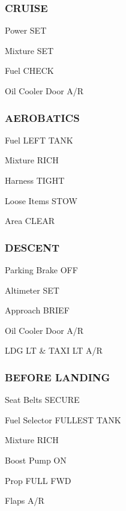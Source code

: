 \begin{multicols}{2}
\subsubsection*{CRUISE}
\begin{enumerate*}
\item Power \dotfill SET
\item Mixture \dotfill SET
\item Fuel \dotfill CHECK
\item Oil Cooler Door \dotfill A/R
\end{enumerate*}

\columnbreak
\subsubsection*{AEROBATICS}
\begin{enumerate*}
\item Fuel \dotfill LEFT TANK
\item Mixture \dotfill RICH
\item Harness \dotfill TIGHT
\item Loose Items \dotfill STOW
\item Area \dotfill CLEAR
\end{enumerate*}

\subsubsection*{DESCENT}
\begin{enumerate*}
\item Parking Brake \dotfill OFF
\item Altimeter \dotfill SET
\item Approach \dotfill BRIEF
\item Oil Cooler Door \dotfill A/R
\item LDG LT \& TAXI LT \dotfill A/R
\end{enumerate*}

\subsubsection*{BEFORE LANDING}
\begin{enumerate*}
\item Seat Belts \dotfill SECURE
\item Fuel Selector \dotfill FULLEST TANK
\item Mixture \dotfill RICH
\item Boost Pump \dotfill ON
\item Prop \dotfill FULL FWD
\item Flaps \dotfill A/R
\end{enumerate*}


\end{multicols}
